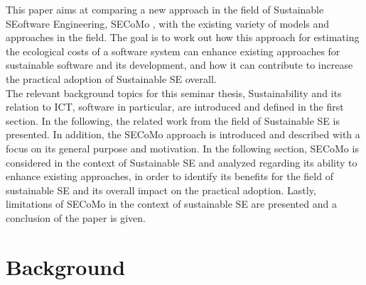 \documentclass[oribibl]{llncs}
\begin{document}
This paper aims at comparing a new approach in the field of Sustainable SEoftware Engineering, SECoMo \cite{schulze_cost_2016}, with the existing variety of models and approaches in the field. The goal is to work out how this approach for estimating the ecological costs of a software system can enhance existing approaches for sustainable software and its development, and how it can contribute to increase the practical adoption of Sustainable SE overall.\\
The relevant background topics for this seminar thesis, Sustainability and its relation to ICT, software in particular, are introduced and defined in the first section. In the following, the related work from the field of Sustainable SE is presented. In addition, the SECoMo approach is introduced and described with a focus on its general purpose and motivation. %
In the following section, SECoMo is considered in the context of Sustainable SE and analyzed regarding its ability to enhance existing approaches, in order to identify its benefits for the field of sustainable SE and its overall impact on the practical adoption. Lastly, limitations of SECoMo in the context of sustainable SE are presented and a conclusion of the paper is given.

\section{Background}
\end{document}
